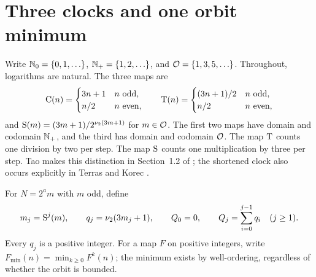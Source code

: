 \section{Three clocks and one orbit minimum}\label{sec:clocks}

Write $\mathbb N_0=\{0,1,\ldots\}$, $\mathbb N_+=\{1,2,\ldots\}$, and
$\mathcal O=\{1,3,5,\ldots\}$.  Throughout, logarithms are natural.
The three maps are
\[
 \mathrm C(n)=\begin{cases}3n+1&n\text{ odd},\\ n/2&n\text{ even},\end{cases}
 \qquad
 \mathrm T(n)=\begin{cases}(3n+1)/2&n\text{ odd},\\ n/2&n\text{ even},\end{cases}
\]
and $\mathrm S(m)=(3m+1)/2^{\nu_2(3m+1)}$ for $m\in\mathcal O$.
The first two maps have domain and codomain $\mathbb N_+$, and the third has
domain and codomain $\mathcal O$.  The map $\mathrm T$ counts one division by two
per step.  The map $\mathrm S$ counts one multiplication by three per step.
Tao makes this distinction in Section~1.2 of \cite{Tao7}; the shortened
clock also occurs explicitly in Terras and Korec \cite{Terras,Korec}.

For $N=2^a m$ with $m$ odd, define
\[
 m_j=\mathrm S^j(m),\qquad q_j=\nu_2(3m_j+1),\qquad
 Q_0=0,\qquad Q_j=\sum_{i=0}^{j-1}q_i\quad(j\geq1).
\]
Every $q_j$ is a positive integer.  For a map $F$ on positive integers,
write $F_{\min}(n)=\min_{k\geq0}F^k(n)$; the minimum exists by
well-ordering, regardless of whether the orbit is bounded.

